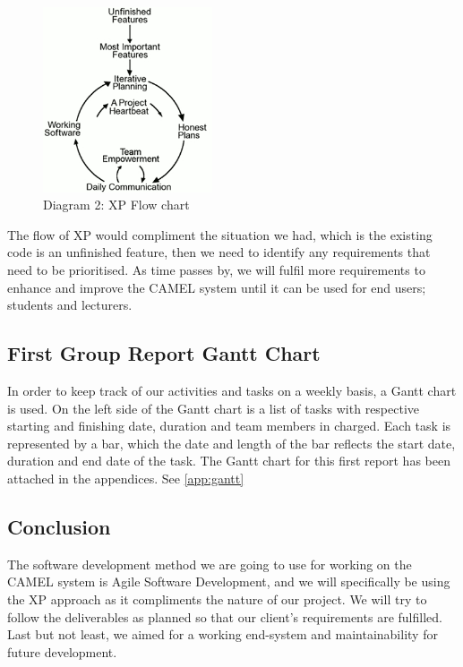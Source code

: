 		\begin{figure}[!htbp]
			\centerline{\includegraphics[width=5cm]{resources/agileflowchart.jpg}}
			\caption{Diagram 2: XP Flow chart \cite{agileXPFlowchart}}
		\end{figure}
		
		The flow of XP would compliment the situation we had, which is the existing code is an unfinished feature, then we need to identify any requirements that need to be prioritised. As time passes by, we will fulfil more requirements to enhance and improve the CAMEL system until it can be used for end users; students and lecturers.
\newpage	
	\subsection*{First Group Report Gantt Chart}
		In order to keep track of our activities and tasks on a weekly basis, a Gantt chart is used. On the left side of the Gantt chart is a list of tasks with respective starting and finishing date, duration and team members in charged. Each task is represented by a bar, which the date and length of the bar reflects the start date, duration and end date of the task. The Gantt chart for this first report has been attached in the appendices. See \ref{app:gantt}  
	
	\subsection*{Conclusion}
		The software development method we are going to use for working on the CAMEL system is Agile Software Development, and we will specifically be using the XP approach as it compliments the nature of our project. We will try to follow the deliverables as planned so that our client’s requirements are fulfilled. Last but not least, we aimed for a working end-system and maintainability for future development.

	

